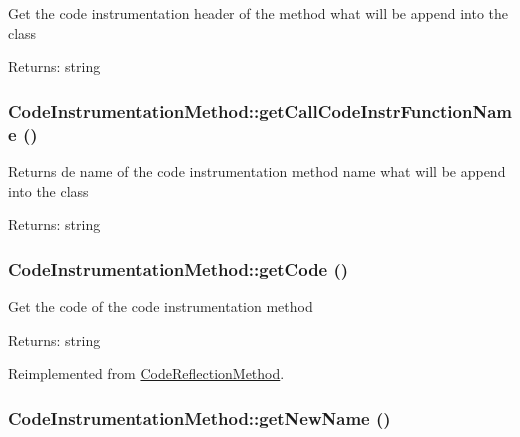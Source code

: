 Get the code instrumentation header of the method what will be append into the class

\begin{Desc}
\item[Returns:]string \end{Desc}
\hypertarget{class_code_instrumentation_method_c07a68881c058097ce6914ce9dc96e4e}{
\subsubsection[{getCallCodeInstrFunctionName}]{\setlength{\rightskip}{0pt plus 5cm}CodeInstrumentationMethod::getCallCodeInstrFunctionName ()}}
\label{class_code_instrumentation_method_c07a68881c058097ce6914ce9dc96e4e}


Returns de name of the code instrumentation method name what will be append into the class

\begin{Desc}
\item[Returns:]string \end{Desc}
\hypertarget{class_code_instrumentation_method_b79054196e5abf3e3464ad0551a9af71}{
\subsubsection[{getCode}]{\setlength{\rightskip}{0pt plus 5cm}CodeInstrumentationMethod::getCode ()}}
\label{class_code_instrumentation_method_b79054196e5abf3e3464ad0551a9af71}


Get the code of the code instrumentation method

\begin{Desc}
\item[Returns:]string \end{Desc}


Reimplemented from \hyperlink{class_code_reflection_method_9ea590fa1500f62805d106332634893e}{CodeReflectionMethod}.\hypertarget{class_code_instrumentation_method_4158b6c8a6183afecc0a9847ad3aeb53}{
\subsubsection[{getNewName}]{\setlength{\rightskip}{0pt plus 5cm}CodeInstrumentationMethod::getNewName ()}}
\label{class_code_instrumentation_method_4158b6c8a6183afecc0a9847ad3aeb53}


